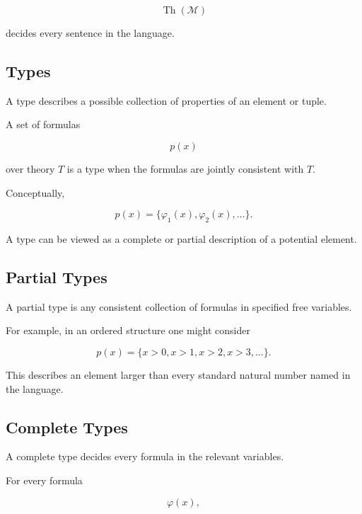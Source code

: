 \[
\boxed{
\operatorname{Th}(\mathcal{M})
}
\]

decides every sentence in the language.

\subsection{Types}
\label{subsec:model-theoretic-types}

A type describes a possible collection of properties of an element or
tuple.

A set of formulas

\[
p(x)
\]

over theory \(T\) is a type when the formulas are jointly consistent with
\(T\).

Conceptually,

\[
\boxed{
p(x)
=
\{
\varphi_1(x),
\varphi_2(x),
\ldots
\}.
}
\]

A type can be viewed as a complete or partial description of a potential
element.

\subsection{Partial Types}
\label{subsec:partial-types}

A partial type is any consistent collection of formulas in specified free
variables.

For example, in an ordered structure one might consider

\[
\boxed{
p(x)
=
\{
x>0,
x>1,
x>2,
x>3,
\ldots
\}.
}
\]

This describes an element larger than every standard natural number named
in the language.

\subsection{Complete Types}
\label{subsec:complete-types}

A complete type decides every formula in the relevant variables.

For every formula

\[
\varphi(x),
\]

